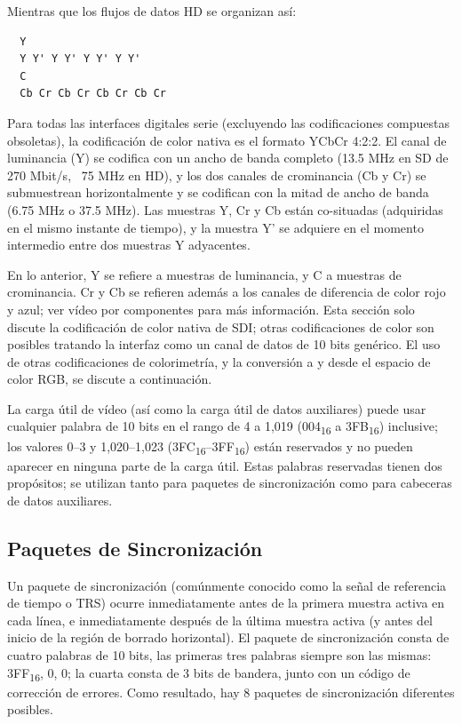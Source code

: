   Mientras que los flujos de datos HD se organizan así:

  \begin{verbatim}
  Y
  Y Y' Y Y' Y Y' Y Y'
  C
  Cb Cr Cb Cr Cb Cr Cb Cr
  \end{verbatim}

  Para todas las interfaces digitales serie (excluyendo las codificaciones compuestas
  obsoletas), la codificación de color nativa es el formato YCbCr 4:2:2. El canal de
  luminancia (Y) se codifica con un ancho de banda completo (13.5 MHz en SD de 270 Mbit/s,
  ~75 MHz en HD), y los dos canales de crominancia (Cb y Cr) se submuestrean horizontalmente
  y se codifican con la mitad de ancho de banda (6.75 MHz o 37.5 MHz). Las muestras Y, Cr y
  Cb están co-situadas (adquiridas en el mismo instante de tiempo), y la muestra Y' se
  adquiere en el momento intermedio entre dos muestras Y adyacentes.

  En lo anterior, Y se refiere a muestras de luminancia, y C a muestras de crominancia. Cr y
  Cb se refieren además a los canales de diferencia de color rojo y azul; ver vídeo por
  componentes para más información. Esta sección solo discute la codificación de color nativa
  de SDI\@; otras codificaciones de color son posibles tratando la interfaz como un canal de
  datos de 10 bits genérico. El uso de otras codificaciones de colorimetría, y la conversión
  a y desde el espacio de color RGB, se discute a continuación.

  La carga útil de vídeo (así como la carga útil de datos auxiliares) puede usar cualquier
  palabra de 10 bits en el rango de 4 a 1,019 (004\textsubscript{16} a 3FB\textsubscript{16})
  inclusive; los valores 0–3 y 1,020–1,023 (3FC\textsubscript{16}–3FF\textsubscript{16}) están
  reservados y no pueden aparecer en ninguna parte de la carga útil. Estas palabras reservadas
  tienen dos propósitos; se utilizan tanto para paquetes de sincronización como para cabeceras
  de datos auxiliares.

  \subsection{Paquetes de Sincronización}

  Un paquete de sincronización (comúnmente conocido como la señal de referencia de tiempo o TRS)
  ocurre inmediatamente antes de la primera muestra activa en cada línea, e inmediatamente después
  de la última muestra activa (y antes del inicio de la región de borrado horizontal). El paquete
  de sincronización consta de cuatro palabras de 10 bits, las primeras tres palabras siempre son
  las mismas: 3FF\textsubscript{16}, 0, 0; la cuarta consta de 3 bits de bandera, junto con un código de corrección
  de errores. Como resultado, hay 8 paquetes de sincronización diferentes posibles.

